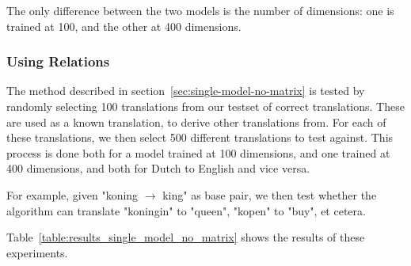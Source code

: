 The only difference between the two models is the number of dimensions: one is trained at 100, and the other at 400 dimensions.

\subsubsection{Using Relations}
The method described in section~\ref{sec:single-model-no-matrix} is tested by randomly selecting 100 translations from our testset of correct translations. These are used as a known translation, to derive other translations from. For each of these translations, we then select 500 different translations to test against. This process is done both for a model trained at 100 dimensions, and one trained at 400 dimensions, and both for Dutch to English and vice versa.

For example, given "koning $\to$ king" as base pair, we then test whether the algorithm can translate "koningin" to "queen", "kopen" to "buy", et cetera.

Table~\ref{table:results_single_model_no_matrix} shows the results of these experiments.

